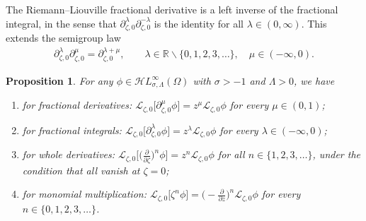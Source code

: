 \documentclass[pdftex]{sigma}
\newcommand{\singexp}[2]{\mathcal{H}L^\infty_{#1, #2}}
\newcommand{\R}{\mathbb{R}}
\newcommand{\fracderiv}[3]{\partial^{#1}_{#2, #3}}
\newcommand{\laplace}{\mathcal{L}}
\numberwithin{equation}{section}
\newtheorem{Proposition}[Theorem]{Proposition}
 { \theoremstyle{definition}
\newtheorem{Definition}[Theorem]{Definition}
\newtheorem{Remark}[Theorem]{Remark}
\newtheorem*{notation*}{Notation}
}
\begin{document}
The Riemann--Liouville fractional derivative is a left inverse of the fractional integral, in the sense that $\fracderiv{\lambda}{\zeta}{ 0} \fracderiv{-\lambda}{\zeta}{0}$ is the identity for all $\lambda \in (0, \infty)$. This extends the semigroup law
\begin{align*}
\fracderiv{\lambda}{\zeta}{0} \fracderiv{\mu}{\zeta}{0} = \fracderiv{\lambda+\mu}{\zeta}{0} ,\qquad \lambda \in \R \smallsetminus \{0, 1, 2, 3, \dots\},\quad\mu \in (-\infty, 0).
\end{align*}
\begin{Proposition}\label{prop:L-int-op}
For any $\phi\in\singexp{\sigma}{\Lambda}(\Omega)$ with $\sigma>-1$ and $\Lambda>0$, we have
\begin{enumerate}[label=(\roman*)]\itemsep=0pt
\item[$(1)$] %
for fractional derivatives:
$\laplace_{\zeta,0} \bigl[\fracderiv{\mu}{\zeta}{0} \phi\bigr] = z^{\mu} \laplace_{\zeta,0} \phi$ for every $\mu\in(0,1)$;
\item[$(2)$] %
for fractional integrals:
$\laplace_{\zeta,0} \bigl[\fracderiv{\lambda}{\zeta}{0} \phi\bigr] = z^{\lambda} \laplace_{\zeta,0} \phi$ for every $\lambda\in(-\infty,0)$;
\item[$(3)$] %
for whole derivatives:
$\laplace_{\zeta,0} \bigl[\bigl(\frac{\partial}{\partial\zeta}\bigr)^n \phi\bigr] = z^{n} \laplace_{\zeta,0} \phi$ for all $n\in\{1, 2, 3, \dots\}$, under the condition that  all vanish at $\zeta = 0$;
\item[$(4)$] %
for monomial multiplication:
$\laplace_{\zeta,0} \bigl[\zeta^n \phi\bigr] = \bigl(-\frac{\partial}{\partial z}\bigr)^n \laplace_{\zeta,0} \phi$ for every $n\in\{0,1,2,3,\dots\}$.
\end{enumerate}
\end{Proposition}
\end{document}
